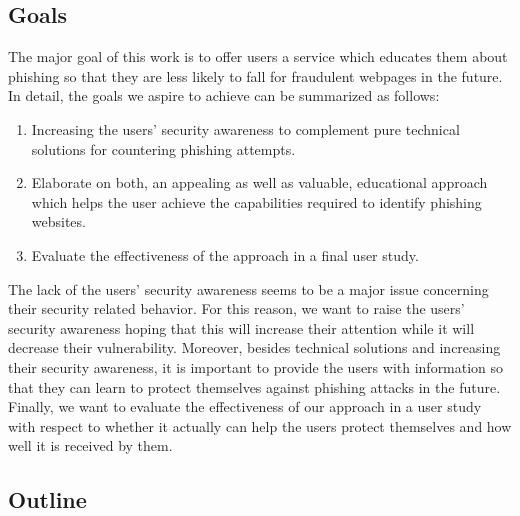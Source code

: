 \subsection{Goals}
\label{s:goals}
The major goal of this work is to offer users a service which educates them about phishing so that they are less likely to fall for fraudulent webpages in the future.
In detail, the goals we aspire to achieve can be summarized as follows:

\begin{enumerate}
	\item Increasing the users' security awareness to complement pure technical solutions for countering phishing attempts.
	\item Elaborate on both, an appealing as well as valuable, educational approach which helps the user achieve the capabilities required to identify phishing websites.
	\item Evaluate the effectiveness of the approach in a final user study.
\end{enumerate}
The lack of the users' security awareness seems to be a major issue concerning their security related behavior.
 For this reason, we want to raise the users' security awareness hoping that this will increase their attention while it will decrease their vulnerability.
 Moreover, besides technical solutions and increasing their security awareness, it is important to provide the users with information so that they can learn to protect themselves against phishing attacks in the future.
Finally, we want to evaluate the effectiveness of our approach in a user study with respect to whether it actually can help the users protect themselves and how well it is received by them.

\subsection{Outline}


